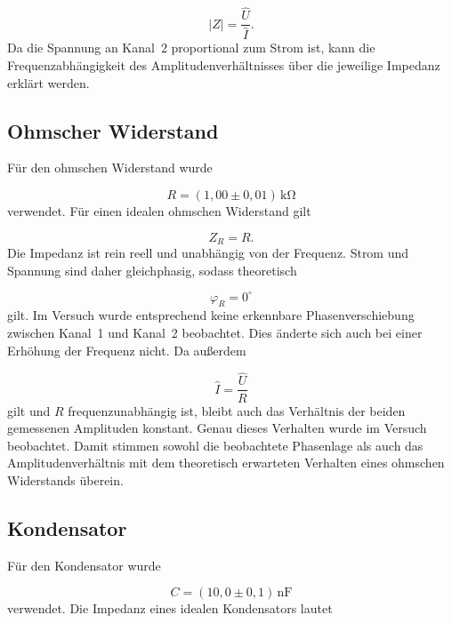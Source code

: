 \documentclass{report}
\begin{document}
\begin{equation}
|Z|=\frac{\hat U}{\hat I}.
\end{equation}
\noindent
Da die Spannung an Kanal~2 proportional zum Strom ist, kann die Frequenzabhängigkeit des Amplitudenverhältnisses über die jeweilige Impedanz erklärt werden.

\subsection{Ohmscher Widerstand}
\noindent
Für den ohmschen Widerstand wurde

\begin{equation}
R=(1{,}00\pm0{,}01)\,\mathrm{k\Omega}
\end{equation}
\noindent
verwendet.
\noindent
Für einen idealen ohmschen Widerstand gilt

\begin{equation}
Z_R=R.
\end{equation}
\noindent
Die Impedanz ist rein reell und unabhängig von der Frequenz. Strom und Spannung sind daher gleichphasig, sodass theoretisch

\begin{equation}
\boxed{\varphi_R=0^\circ}
\end{equation}
\noindent
gilt.
\noindent
Im Versuch wurde entsprechend keine erkennbare Phasenverschiebung zwischen Kanal~1 und Kanal~2 beobachtet. Dies änderte sich auch bei einer Erhöhung der Frequenz nicht.
\noindent
Da außerdem

\begin{equation}
\hat I=\frac{\hat U}{R}
\end{equation}
\noindent
gilt und $R$ frequenzunabhängig ist, bleibt auch das Verhältnis der beiden gemessenen Amplituden konstant. Genau dieses Verhalten wurde im Versuch beobachtet.
\noindent
Damit stimmen sowohl die beobachtete Phasenlage als auch das Amplitudenverhältnis mit dem theoretisch erwarteten Verhalten eines ohmschen Widerstands überein.

\subsection{Kondensator}
\noindent
Für den Kondensator wurde

\begin{equation}
C=(10{,}0\pm0{,}1)\,\mathrm{nF}
\end{equation}
\noindent
verwendet.
\noindent
Die Impedanz eines idealen Kondensators lautet
\end{document}
